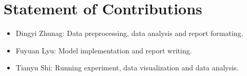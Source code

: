 \documentclass[11pt]{scrartcl}
\begin{document}
\section{Statement of Contributions}

\begin{itemize}
	\item Dingyi Zhunag: Data preprocessing, data analysis and report formating.
	\item Fuyuan Lyu: Model implementation and report writing.
	\item Tianyu Shi: Running experiment, data visualization and data analysis.
\end{itemize}



\end{document}
